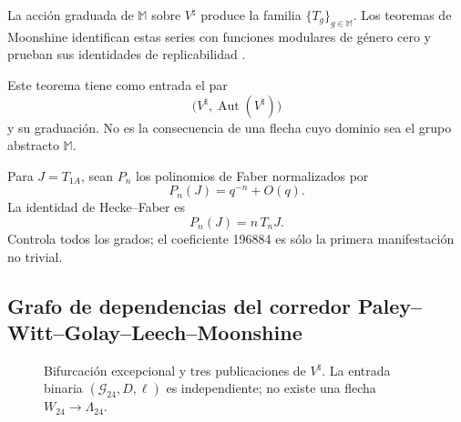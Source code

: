 \begin{theorem}
\label{p12-83-c20-s8:thm:moonshine-monstruoso-u031}
La acción graduada de \(\mathbb M\) sobre \(V^\natural\) produce la familia
\(\{T_g\}_{g\in\mathbb M}\). Los teoremas de Moonshine identifican estas
series con funciones modulares de género cero y prueban sus identidades de
replicabilidad
\cite{ConwayNorton1979,Borcherds1992,FLM1988}.
\end{theorem}

Este teorema tiene como entrada el par
\[
 \bigl(V^\natural,\operatorname{Aut}(V^\natural)\bigr)
\]
y su graduación. No es la consecuencia de una flecha cuyo dominio sea el
grupo abstracto \(\mathbb M\).

Para \(J=T_{1A}\), sean \(P_n\) los polinomios de Faber normalizados por
\[
 P_n(J)=q^{-n}+O(q).
\]
La identidad de Hecke--Faber es
\begin{equation}
 P_n(J)=n\,T_nJ.
 \label{p12-83-c20-s8:eq:hecke-faber-u031}
\end{equation}
Controla todos los grados; el coeficiente 196884 es sólo la primera
manifestación no trivial.

\subsection{Grafo de dependencias del corredor Paley–Witt–Golay–Leech–Moonshine}

\begin{figure}[htbp]
\centering
{}
\caption{Bifurcación excepcional y tres publicaciones de
\(V^\natural\). La entrada binaria \((\mathcal G_{24},D,\ell)\) es
independiente; no existe una flecha \(W_{24}\to\Lambda_{24}\).}
\label{p12-83-c20-s8:fig:grafo-excepcional-moonshine-u031}
\end{figure}

